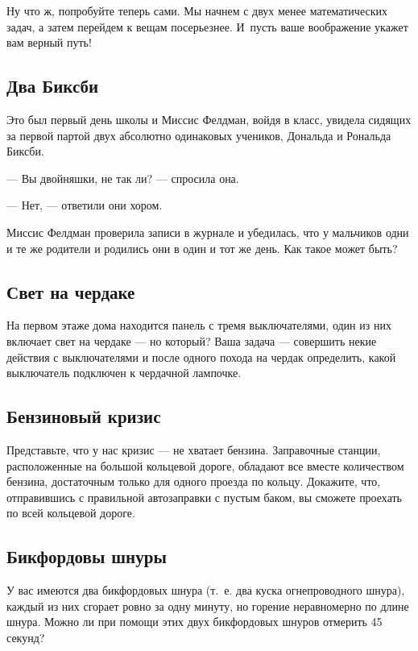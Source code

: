 \medskip

Ну что ж, попробуйте теперь сами.
Мы начнем с двух менее математических задач, а затем перейдем к вещам посерьезнее.
И~пусть ваше воображение укажет вам верный путь!

\subsection*{Два Биксби} %

Это был первый день школы и Миссис Фелдман, войдя в класс, увидела сидящих за первой партой двух абсолютно одинаковых учеников, Дональда и Рональда Биксби.

--- Вы двойняшки, не так ли? --- спросила она.

--- Нет, --- ответили они хором.

Миссис Фелдман проверила записи в журнале и убедилась, что у мальчиков одни и те же родители и родились они в один и тот же день.
Как такое может быть?

\subsection*{Свет на чердаке} %

На первом этаже дома находится панель с тремя выключателями, один из них включает свет на чердаке --- но который? 
Ваша задача --- совершить некие действия с выключателями и после одного похода на чердак определить, какой выключатель подключен к чердачной лампочке.

\subsection*{Бензиновый кризис} %

Представьте, что у нас кризис --- не хватает бензина.
Заправочные станции, расположенные на большой кольцевой дороге, обладают все вместе количеством бензина, достаточным только для одного проезда по кольцу.
Докажите, что, отправившись с правильной автозаправки с пустым баком, вы сможете проехать по всей кольцевой дороге.

\subsection*{Бикфордовы шнуры} %

У вас имеются два бикфордовых шнура (т.~е. два куска огнепроводного шнура), каждый из них сгорает ровно за одну минуту, но горение неравномерно по длине шнура.
Можно ли при помощи этих двух бикфордовых шнуров отмерить 45 секунд?

